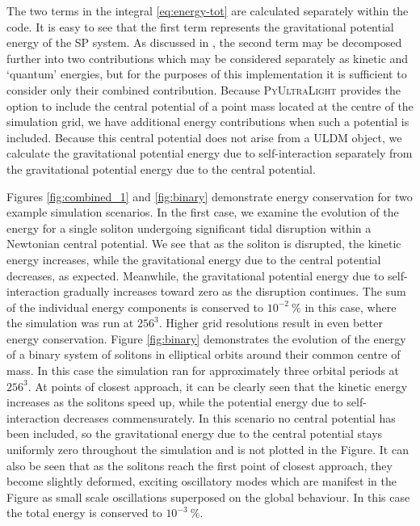 \documentclass[a4paper,11pt]{article}
\newcommand{\PyUltraLight}{\textsc{PyUltraLight}\xspace}
\begin{document}
The two terms in the integral \ref{eq:energy-tot} are calculated separately within the code. It is easy to see that the first term represents the gravitational potential energy of the SP system. As discussed in \cite{Hui2016}, the second term may be decomposed further into two contributions which may be considered separately as kinetic and `quantum' energies, but for the purposes of this implementation it is sufficient to consider only their combined contribution. Because \PyUltraLight provides the option to include the central potential of a point mass located at the centre of the simulation grid, we have additional energy contributions when such a potential is included. Because this central potential does not arise from a ULDM object, we calculate the gravitational potential energy due to self-interaction separately from the gravitational potential energy due to the central potential.

Figures \ref{fig:combined_1} and \ref{fig:binary} demonstrate energy conservation for two example simulation scenarios. In the first case, we examine the evolution of the energy for a single soliton undergoing significant tidal disruption within a Newtonian central potential. We see that as the soliton is disrupted, the kinetic energy increases, while the gravitational energy due to the central potential decreases, as expected. Meanwhile, the gravitational potential energy due to self-interaction gradually increases toward zero as the disruption continues. The sum of the individual energy components is conserved to $10^{-2}\ \%$ in this case, where the simulation was run at $256^3$. Higher grid resolutions result in even better energy conservation. Figure \ref{fig:binary} demonstrates the evolution of the energy of a binary system of solitons in elliptical orbits around their common centre of mass. In this case the simulation ran for approximately three orbital periods at $256^3$. At points of closest approach, it can be clearly seen that the kinetic energy increases as the solitons speed up, while the potential energy due to self-interaction decreases commensurately. In this scenario no central potential has been included, so the gravitational energy due to the central potential stays uniformly zero throughout the simulation and is not plotted in the Figure. It can also be seen that as the solitons reach the first point of closest approach, they become slightly deformed, exciting oscillatory modes which are manifest in the Figure as small scale oscillations superposed on the global behaviour. In this case the total energy is conserved to $10^{-3}\ \%$.
\end{document}
